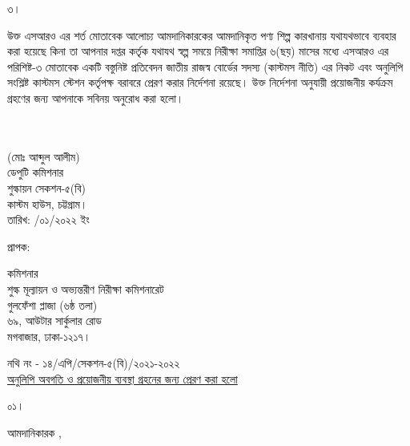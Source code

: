 \documentclass[12pt]{article}
\newcommand{\fileno}{নথি নং - ১৪/এপি/সেকশন-৫(বি)/২০২১-২০২২}
\newcommand{\impn}{\jsml}
\newcommand{\impadd}{\jsmla}
\newcommand{\rodt}{তারিখ: \hspace{2.0em}/০১/২০২২ ইং}
\begin{document}
\begin{minipage}[t]{.07\linewidth}
৩।
\end{minipage}
\begin{minipage}[t]{.93\linewidth}
উক্ত এসআরও এর শর্ত মোতাবেক
আলোচ্য আমদানিকারকের আমদানিকৃত পণ্য
শিল্প কারখানায় যথাযথভাবে ব্যবহার করা হয়েছে
কিনা তা আপনার দপ্তর কর্তৃক
যথাযথ স্বল্প সময়ে
নিরীক্ষা সমাপ্তির ৬(ছয়) মাসের মধ্যে এসআরও
এর পরিশিষ্ট-৩ মোতাবেক একটি বস্তুনিষ্ট
প্রতিবেদন জাতীয় রাজস্ব বোর্ডের সদস্য
(কাস্টমস নীতি) এর নিকট এবং অনুলিপি সংশ্লিষ্ট
কাস্টমস স্টেশন কর্তৃপক্ষ বরাবরে প্রেরণ করার
নির্দেশনা রয়েছে। উক্ত নির্দেশনা
অনুযায়ী প্রয়োজনীয় কর্যক্রম গ্রহণের জন্য
আপনাকে সবিনয় অনুরোধ করা হলো।
\\
\\
\\
\end{minipage}
\begin{minipage}[t]{0.60\linewidth}
\hspace{1em}
\end{minipage}
\begin{minipage}[t]{0.40\linewidth}
\begin{center}
(মোঃ আব্দুল আলীম)
\\
ডেপুটি কমিশনার
\\
শুল্কায়ন সেকশন-৫(বি)
\\
কাস্টম হাউস, চট্টগ্রাম।
\\
\footnotesize{{\rodt}}
\vspace*{5MM}
\end{center}
\end{minipage}
\begin{minipage}[t]{.07\linewidth}
প্রাপক:
\end{minipage}
\begin{minipage}[t]{.93\linewidth}
কমিশনার
\\
শুল্ক মূল্যায়ন ও অভ্যন্তরীণ নিরীক্ষা কমিশনারেট
\\
গুলফেঁশা প্লাজা (৬ষ্ঠ তলা)
\\
৬৯, আউটার সার্কুলার রোড
\\
মগবাজার, ঢাকা-১২১৭।
\\
\end{minipage}
\footnotesize{{\fileno}}
\\
\underline{\footnotesize{অনুলিপি অবগতি ও প্রয়োজনীয় ব্যবস্থা গ্রহনের জন্য প্রেরণ করা হলো}}
\\
\begin{minipage}[t]{0.06\linewidth}
\footnotesize{০১।}
\end{minipage}
\begin{minipage}[t]{0.94\linewidth}
\footnotesize{
আমদানিকারক {\impn}, {\impadd}
}
\end{minipage}
\end{document}
